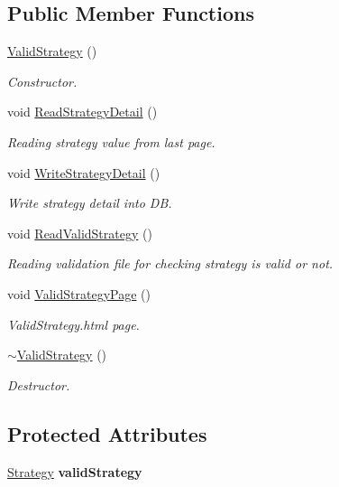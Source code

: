 \subsection*{Public Member Functions}
\begin{DoxyCompactItemize}
\item 
\hyperlink{classValidStrategy_ae168db88ebfa1eabdd7f241a631ffc27}{Valid\-Strategy} ()
\begin{DoxyCompactList}\small\item\em Constructor. \end{DoxyCompactList}\item 
void \hyperlink{classValidStrategy_ae8b17f98d81f8f70d974139086495dfa}{Read\-Strategy\-Detail} ()
\begin{DoxyCompactList}\small\item\em Reading strategy value from last page. \end{DoxyCompactList}\item 
void \hyperlink{classValidStrategy_a093620e19cef0865e6e38a26bb41b8bd}{Write\-Strategy\-Detail} ()
\begin{DoxyCompactList}\small\item\em Write strategy detail into D\-B. \end{DoxyCompactList}\item 
void \hyperlink{classValidStrategy_a234ca3ab5aa4684306148afa47b6860b}{Read\-Valid\-Strategy} ()
\begin{DoxyCompactList}\small\item\em Reading validation file for checking strategy is valid or not. \end{DoxyCompactList}\item 
void \hyperlink{classValidStrategy_ad89451a935f815b4c85b595135d70d94}{Valid\-Strategy\-Page} ()
\begin{DoxyCompactList}\small\item\em Valid\-Strategy.\-html page. \end{DoxyCompactList}\item 
\hyperlink{classValidStrategy_aec9e6ff1c9e9058a17f5488fe3e6cfec}{$\sim$\-Valid\-Strategy} ()
\begin{DoxyCompactList}\small\item\em Destructor. \end{DoxyCompactList}\end{DoxyCompactItemize}
\subsection*{Protected Attributes}
\begin{DoxyCompactItemize}
\item 
\hypertarget{classValidStrategy_aac23ca61c16d79b48603a7db96617003}{\hyperlink{classStrategy}{Strategy} {\bfseries valid\-Strategy}}\label{classValidStrategy_aac23ca61c16d79b48603a7db96617003}

\end{DoxyCompactItemize}
